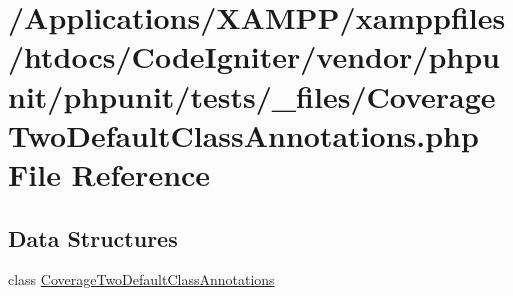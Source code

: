 \hypertarget{phpunit_2tests_2__files_2_coverage_two_default_class_annotations_8php}{}\section{/\+Applications/\+X\+A\+M\+P\+P/xamppfiles/htdocs/\+Code\+Igniter/vendor/phpunit/phpunit/tests/\+\_\+files/\+Coverage\+Two\+Default\+Class\+Annotations.php File Reference}
\label{phpunit_2tests_2__files_2_coverage_two_default_class_annotations_8php}
\subsection*{Data Structures}
\begin{DoxyCompactItemize}
\item 
class \mbox{\hyperlink{class_coverage_two_default_class_annotations}{Coverage\+Two\+Default\+Class\+Annotations}}
\end{DoxyCompactItemize}
